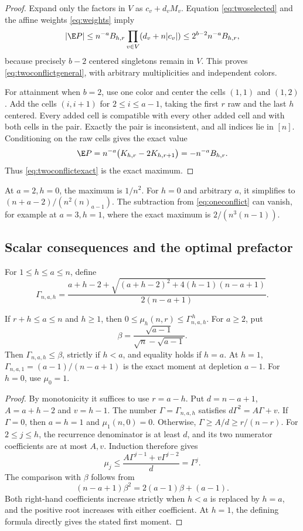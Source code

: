 \begin{proof}
Expand only the factors in $V$ as $c_v+d_vM_v$. Equation \eqref{eq:twoselected} and the affine weights \eqref{eq:weights} imply
\[
|\E P|\le n^{-a}B_{h,r}
\prod_{v\in V}(d_v+n|c_v|)
\le2^{b-2}n^{-a}B_{h,r},
\]
because precisely $b-2$ centered singletons remain in $V$. This proves \eqref{eq:twoconflictgeneral}, with arbitrary multiplicities and independent colors.

For attainment when $b=2$, use one color and center the cells $(1,1)$ and $(1,2)$. Add the cells $(i,i+1)$ for $2\le i\le a-1$, taking the first $r$ raw and the last $h$ centered. Every added cell is compatible with every other added cell and with both cells in the pair. Exactly the pair is inconsistent, and all indices lie in $[n]$. Conditioning on the raw cells gives the exact value
\[
\E P=n^{-a}\bigl(K_{h,r}-2K_{h,r+1}\bigr)
=-n^{-a}B_{h,r}.
\]
Thus \eqref{eq:twoconflictexact} is the exact maximum.
\end{proof}

At $a=2,h=0$, the maximum is $1/n^2$. For $h=0$ and arbitrary $a$, it simplifies to $(n+a-2)/(n^2(n)_{a-1})$. The subtraction from \eqref{eq:oneconflict} can vanish, for example at $a=3,h=1$, where the exact maximum is $2/(n^3(n-1))$.

\subsection{Scalar consequences and the optimal prefactor}

For $1\le h\le a\le n$, define
\begin{equation}\label{eq:mixedgamma-def}
\Gamma_{n,a,h}=
\frac{a+h-2+\sqrt{(a+h-2)^2+4(h-1)(n-a+1)}}
{2(n-a+1)}.
\end{equation}
\begin{lemma}\label{lem:super}
If $r+h\le a\le n$ and $h\ge1$, then
$0\le\mu_h(n,r)\le\Gamma_{n,a,h}^{\,h}$.
For $a\ge2$, put
\[
\beta=\frac{\sqrt{a-1}}{\sqrt n-\sqrt{a-1}}.
\]
Then $\Gamma_{n,a,h}\le\beta$, strictly if $h<a$, and equality holds if $h=a$. At $h=1$, $\Gamma_{n,a,1}=(a-1)/(n-a+1)$ is the exact moment at depletion $a-1$. For $h=0$, use $\mu_0=1$.
\end{lemma}
\begin{proof}
By monotonicity it suffices to use $r=a-h$. Put
$d=n-a+1$, $A=a+h-2$ and $v=h-1$. The number $\Gamma=\Gamma_{n,a,h}$ satisfies
$d\Gamma^2=A\Gamma+v$. If $\Gamma=0$, then $a=h=1$ and $\mu_1(n,0)=0$. Otherwise,
$\Gamma\ge A/d\ge r/(n-r)$.
For $2\le j\le h$, the recurrence denominator is at least $d$, and its two numerator coefficients are at most $A,v$. Induction therefore gives
\[
\mu_j\le\frac{A\Gamma^{j-1}+v\Gamma^{j-2}}d=\Gamma^j.
\]
The comparison with $\beta$ follows from
\begin{equation}\label{eq:beta}
(n-a+1)\beta^2=2(a-1)\beta+(a-1).
\end{equation}
Both right-hand coefficients increase strictly when $h<a$ is replaced by $h=a$, and the positive root increases with either coefficient. At $h=1$, the defining formula directly gives the stated first moment.
\end{proof}

